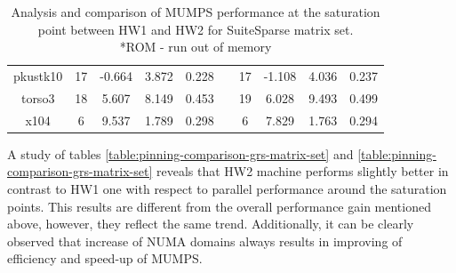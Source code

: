 \begin{table}[htpb]
\begin{tabular}{c|c|c|c|c|c|c|c|c|c|}
\multicolumn{1}{|c|}{pkustk10}                                              & 17  & -0.664                                                                & 3.872                                              & 0.228                                                  &  & 17  & -1.108                                                                & 4.036                                              & 0.237                                                  \\ \cline{1-5} \cline{7-10} 
\multicolumn{1}{|c|}{torso3}                                                & 18  & 5.607                                                                 & 8.149                                              & 0.453                                                  &  & 19  & 6.028                                                                 & 9.493                                              & 0.499                                                  \\ \cline{1-5} \cline{7-10} 
\multicolumn{1}{|c|}{x104}                                                  & 6   & 9.537                                                                 & 1.789                                              & 0.298                                                  &  & 6   & 7.829                                                                 & 1.763                                              & 0.294                                                  \\ \cline{1-5} \cline{7-10} 
\end{tabular}
\caption{Analysis and comparison of MUMPS performance at the saturation point between HW1 and HW2 for SuiteSparse matrix set.\\
*ROM - run out of memory}
\label{table:pinning-comparison-suitesparse-matrix-set}
\end{table}


A study of tables \ref{table:pinning-comparison-grs-matrix-set} and \ref{table:pinning-comparison-grs-matrix-set} reveals that HW2 machine performs slightly better in contrast to HW1 one with respect to parallel performance around the saturation points. This results are different from the overall performance gain mentioned above, however, they reflect the same trend. Additionally, it can be clearly observed that increase of NUMA domains always results in improving of efficiency and speed-up of MUMPS.\\


